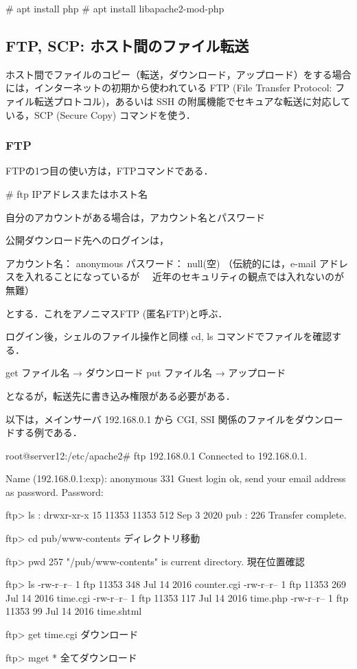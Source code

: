 \begin{cli}
# apt install php
# apt install libapache2-mod-php
\end{cli}

\subsection{FTP, SCP: ホスト間のファイル転送}

ホスト間でファイルのコピー（転送，ダウンロード，アップロード）をする場合には，インターネットの初期から使われている FTP (File Transfer Protocol: ファイル転送プロトコル)，あるいは SSH の附属機能でセキュアな転送に対応している，SCP (Secure Copy) コマンドを使う．

\subsubsection{FTP}

FTPの1つ目の使い方は，FTPコマンドである．

\begin{cli}
# ftp IPアドレスまたはホスト名 

自分のアカウントがある場合は，アカウント名とパスワード

公開ダウンロード先へのログインは，

アカウント名： anonymous
パスワード： null(空)
（伝統的には，e-mail アドレスを入れることになっているが
　近年のセキュリティの観点では入れないのが無難）

とする．これをアノニマスFTP (匿名FTP)と呼ぶ．

ログイン後，シェルのファイル操作と同様 cd, ls コマンドでファイルを確認する．

get ファイル名 → ダウンロード
put ファイル名 → アップロード

となるが，転送先に書き込み権限がある必要がある．
\end{cli}

以下は，メインサーバ 192.168.0.1 から CGI, SSI 関係のファイルをダウンロードする例である．

\begin{cli}

root@server12:/etc/apache2# ftp 192.168.0.1
Connected to 192.168.0.1.

Name (192.168.0.1:exp): anonymous
331 Guest login ok, send your email address as password.
Password:

ftp> ls
:
drwxr-xr-x  15 11353  11353      512 Sep  3  2020 pub
:
226 Transfer complete.

ftp> cd pub/www-contents
ディレクトリ移動

ftp> pwd
257 "/pub/www-contents" is current directory.
現在位置確認

ftp> ls
-rw-r--r--  1 ftp  11353  348 Jul 14  2016 counter.cgi
-rw-r--r--  1 ftp  11353  269 Jul 14  2016 time.cgi
-rw-r--r--  1 ftp  11353  117 Jul 14  2016 time.php
-rw-r--r--  1 ftp  11353   99 Jul 14  2016 time.shtml

ftp> get time.cgi
ダウンロード

ftp> mget *
全てダウンロード

\end{cli}

